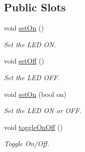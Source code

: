 \subsection*{Public Slots}
\begin{DoxyCompactItemize}
\item 
\hypertarget{classmdt_led_a389ee3e0082ce8fa38cb258944a04892}{
void \hyperlink{classmdt_led_a389ee3e0082ce8fa38cb258944a04892}{setOn} ()}
\label{classmdt_led_a389ee3e0082ce8fa38cb258944a04892}

\begin{DoxyCompactList}\small\item\em Set the LED ON. \end{DoxyCompactList}\item 
\hypertarget{classmdt_led_a4c8f5f6aa91b7c90ae6b1aa4933ba6e0}{
void \hyperlink{classmdt_led_a4c8f5f6aa91b7c90ae6b1aa4933ba6e0}{setOff} ()}
\label{classmdt_led_a4c8f5f6aa91b7c90ae6b1aa4933ba6e0}

\begin{DoxyCompactList}\small\item\em Set the LED OFF. \end{DoxyCompactList}\item 
void \hyperlink{classmdt_led_aabbe7fcb23d539946dffec4526c89495}{setOn} (bool on)
\begin{DoxyCompactList}\small\item\em Set the LED ON or OFF. \end{DoxyCompactList}\item 
void \hyperlink{classmdt_led_a9e86ff65f2ec1bfb6131e2b9042609e8}{toggleOnOff} ()
\begin{DoxyCompactList}\small\item\em Toggle On/Off. \end{DoxyCompactList}\end{DoxyCompactItemize}
